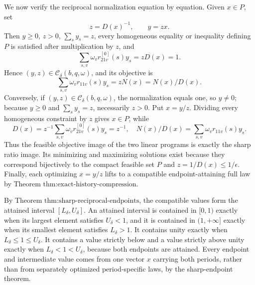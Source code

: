 We now verify the reciprocal normalization equation by equation.  Given \(x\in P\), set
\[
z=D(x)^{-1},\qquad y=zx.
\]
Then \(y\geq0\), \(z>0\), \(\sum_sy_s=z\), every homogeneous equality or inequality defining \(P\) is satisfied after multiplication by \(z\), and
\[
\sum_{s,v}\omega_vr^{[0]}_{21v}(s)y_s=zD(x)=1.
\]
Hence \((y,z)\in\mathcal C_\delta(b,q,\omega)\), and its objective is
\[
\sum_{s,v}\omega_vr_{11v}(s)y_s=zN(x)=N(x)/D(x).
\]
Conversely, if \((y,z)\in\mathcal C_\delta(b,q,\omega)\), the normalization equals one, so \(y\ne0\); because \(y\geq0\) and \(\sum_sy_s=z\), necessarily \(z>0\).  Put \(x=y/z\).  Dividing every homogeneous constraint by \(z\) gives \(x\in P\), while
\[
D(x)=z^{-1}\sum_{s,v}\omega_vr^{[0]}_{21v}(s)y_s=z^{-1},
\quad
N(x)/D(x)=\sum_{s,v}\omega_vr_{11v}(s)y_s.
\]
Thus the feasible objective image of the two linear programs is exactly the sharp ratio image.  Its minimizing and maximizing solutions exist because they correspond bijectively to the compact feasible set \(P\) and \(z=1/D(x)\leq1/\epsilon\).  Finally, each optimizing \(x=y/z\) lifts to a compatible endpoint-attaining full law by Theorem \(\text{thm:exact-history-compression}\).

By Theorem \(\text{thm:sharp-reciprocal-endpoints}\), the compatible values form the attained interval \([L_\delta,U_\delta]\).  An attained interval is contained in \([0,1)\) exactly when its largest element satisfies \(U_\delta<1\), and it is contained in \((1,+\infty]\) exactly when its smallest element satisfies \(L_\delta>1\).  It contains unity exactly when \(L_\delta\leq1\leq U_\delta\).  It contains a value strictly below and a value strictly above unity exactly when \(L_\delta<1<U_\delta\), because both endpoints are attained.  Every endpoint and intermediate value comes from one vector \(x\) carrying both periods, rather than from separately optimized period-specific laws, by the sharp-endpoint theorem.

